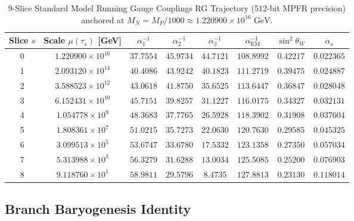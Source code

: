 \documentclass[11pt,letterpaper]{article}
\theoremstyle{plain}
\begin{document}
\begin{table}[htbp]
\centering
\caption{9-Slice Standard Model Running Gauge Couplings RG Trajectory (512-bit MPFR precision) anchored at $M_N = M_P / 1000 \approx 1.220900 \times 10^{16}\text{ GeV}$.}
\label{tab:sm_gauge_couplings}
\small
\begin{tabular}{cccccccc}
\toprule
Slice $s$ & Scale $\mu(\tau_s)$ [GeV] & $\alpha_1^{-1}$ & $\alpha_2^{-1}$ & $\alpha_3^{-1}$ & $\alpha_{\mathrm{EM}}^{-1}$ & $\sin^2\theta_W$ & $\alpha_s$ \\
\midrule
0 & $1.220900 \times 10^{16}$ & $37.7554$ & $45.9734$ & $44.7121$ & $108.8992$ & $0.42217$ & $0.022365$ \\
1 & $2.093120 \times 10^{14}$ & $40.4086$ & $43.9242$ & $40.1823$ & $111.2719$ & $0.39475$ & $0.024887$ \\
2 & $3.588523 \times 10^{12}$ & $43.0618$ & $41.8750$ & $35.6525$ & $113.6447$ & $0.36847$ & $0.028048$ \\
3 & $6.152431 \times 10^{10}$ & $45.7151$ & $39.8257$ & $31.1227$ & $116.0175$ & $0.34327$ & $0.032131$ \\
4 & $1.054778 \times 10^{9}$  & $48.3683$ & $37.7765$ & $26.5928$ & $118.3902$ & $0.31908$ & $0.037604$ \\
5 & $1.808361 \times 10^{7}$  & $51.0215$ & $35.7273$ & $22.0630$ & $120.7630$ & $0.29585$ & $0.045325$ \\
6 & $3.099513 \times 10^{5}$  & $53.6747$ & $33.6780$ & $17.5332$ & $123.1358$ & $0.27350$ & $0.057034$ \\
7 & $5.313988 \times 10^{3}$  & $56.3279$ & $31.6288$ & $13.0034$ & $125.5085$ & $0.25200$ & $0.076903$ \\
8 & $9.118760 \times 10^{1}$  & $58.9811$ & $29.5796$ & $8.4735$  & $127.8813$ & $0.23130$ & $0.118014$ \\
\bottomrule
\end{tabular}
\end{table}


\subsection{Branch Baryogenesis Identity}
\end{document}
